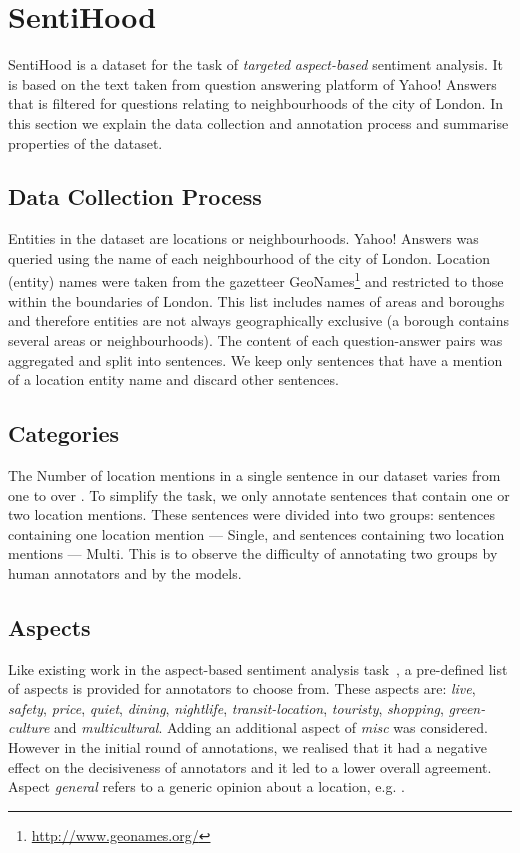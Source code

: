 \documentclass[11pt]{article}
\begin{document}
\section{SentiHood}
    SentiHood is a dataset for the task of \emph{targeted} \emph{aspect-based} sentiment analysis. It is based on the text taken from question answering platform of Yahoo! Answers that is filtered for questions relating to neighbourhoods of the city of London. In this section we explain the data collection and annotation process and summarise properties of the dataset.
    \subsection{Data Collection Process}
        Entities in the dataset are locations or neighbourhoods. Yahoo! Answers was queried using the name of each neighbourhood of the city of London. Location (entity) names were taken from the gazetteer GeoNames\footnote{\url{http://www.geonames.org/}} and restricted to those within the boundaries of London. This list includes names of areas and boroughs and therefore entities are not always geographically exclusive (a borough contains several areas or neighbourhoods). The content of each question-answer pairs was aggregated and split into sentences. We keep only sentences that have a mention of a location entity name and discard other sentences.
 
    \subsection{Categories}
    The Number of location mentions in a single sentence in our dataset varies from one to over . To simplify the task, we only annotate sentences that contain one or two location mentions. These sentences were divided into two groups: sentences containing one location mention --- Single, and sentences containing two location mentions --- Multi. This is to observe the difficulty of annotating two groups by human annotators and by the models.
    
    \subsection{Aspects} 
    Like existing work in the aspect-based sentiment analysis task~\cite{brychcin2014uwb}, a pre-defined list of aspects is provided for annotators to choose from. These aspects are: \textit{live}, \textit{safety}, \textit{price}, \textit{quiet}, \textit{dining}, \textit{nightlife}, \textit{transit-location}, \textit{touristy}, \textit{shopping}, \textit{green-culture} and \textit{multicultural}. Adding an additional aspect of \textit{misc} was considered. However in the initial round of annotations, we realised that it had a negative effect on the decisiveness of annotators and it led to a lower overall agreement. Aspect \textit{general} refers to a generic opinion about a location, e.g. .  
    
\end{document}
